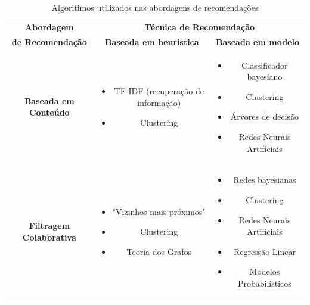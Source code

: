 \begin{table}[]
	\centering
	\caption{Algoritimos utilizados nas abordagens de recomendações}
	\label{tab01}
	\begin{tabular}{|c|c|c|}
	\hline
	\rowcolor[HTML]{C0C0C0} 
	\cellcolor[HTML]{C0C0C0} \textbf{Abordagem} & \multicolumn{2}{c|}{\cellcolor[HTML]{C0C0C0} \textbf{Técnica de Recomendação}} \\ \cline{2-3} 
	\rowcolor[HTML]{C0C0C0} \textbf{de Recomendação}
	\multirow{-2}{*}{\cellcolor[HTML]{C0C0C0}} &  \textbf{Baseada em heurística} & \textbf{Baseada em modelo} \\ \hline
	\textbf{Baseada em Conteúdo	}   & \begin{minipage} [t] {0.3\textwidth} \begin{itemize} \item TF-IDF (recuperação de informação) \item Clustering \end{itemize} \end{minipage} & \begin{minipage} [t] {0.3\textwidth} \begin{itemize} \item Classificador bayesiano \item Clustering \item Árvores de decisão \item Redes Neurais Artificiais \end{itemize} \end{minipage} \\ \hline
	\rowcolor[HTML]{EFEFEF} 
	\textbf{Filtragem Colaborativa}	& \begin{minipage} [t] {0.3\textwidth} \begin{itemize} \item "Vizinhos mais próximos" \item Clustering \item Teoria dos Grafos \end{itemize} \end{minipage} & \begin{minipage} [t] {0.3\textwidth} \begin{itemize} \item  Redes bayesianas \item Clustering \item Redes Neurais Artificiais \item Regressão Linear \item Modelos Probabilísticos \end{itemize} \end{minipage} \\ \hline

\end{tabular}
\end{table}
